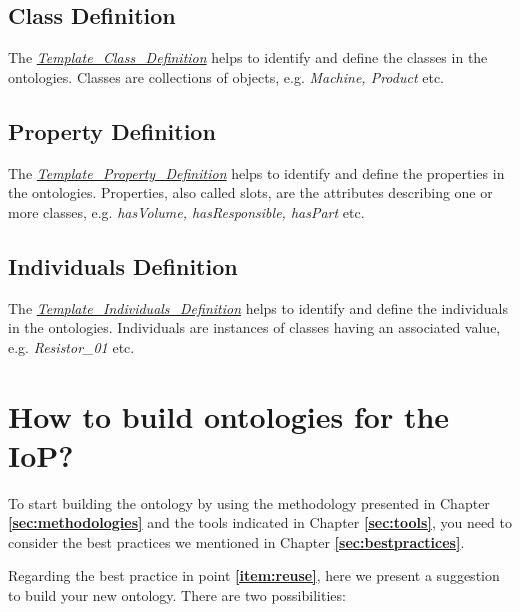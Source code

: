\documentclass{guideline/sty/rapport}
\begin{document}
\subsection{Class Definition}
The \href{https://docs.google.com/spreadsheets/d/16g3pAnE-fzbQydI0m5zkswAc83r881oBgKarQaCkGa0/edit#gid=0}{\textit{Template\_Class\_Definition}} helps to identify and define the classes in the ontologies. Classes are collections of objects, e.g. \textit{Machine, Product} etc.

\subsection{Property Definition}

The \href{https://docs.google.com/spreadsheets/d/1pmVIaY3WwofKMBwXdqbiCgXH5DL4rNx-ZhKlHUdZoRo/edit#gid=0}{\textit{Template\_Property\_Definition}} helps to identify and define the properties in the ontologies. Properties, also called slots, are the attributes describing one or more classes, e.g. \textit{hasVolume, hasResponsible, hasPart} etc.

\subsection{Individuals Definition}
The \href{https://docs.google.com/spreadsheets/d/11_twMjg6mwAQoefg4pRDqZCcsNCKwbrflg0NIkcyF1I/edit#gid=0}{\textit{Template\_Individuals\_Definition}} helps to identify and define the individuals in the ontologies. Individuals are instances of classes having an associated value, e.g. \textit{Resistor\_01} etc.

\newpage

\section{How to build ontologies for the IoP?} \label{sec:architecturalsuggestions}

To start building the ontology by using the methodology presented in Chapter \textbf{\ref{sec:methodologies}} and the tools indicated in Chapter \textbf{\ref{sec:tools}}, you need to consider the best practices we mentioned in Chapter \textbf{\ref{sec:bestpractices}}. \singlespacing

Regarding the best practice in point \textbf{\ref{item:reuse}}, here we present a suggestion to build your new ontology. There are two possibilities: \singlespacing
\end{document}
